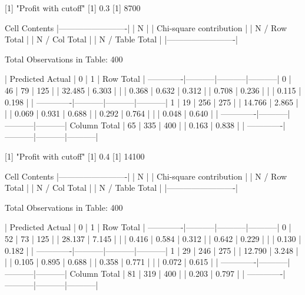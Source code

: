 \documentclass{article}
\begin{document}
\begin{Schunk}
\begin{Soutput}
 
[1] "Profit with cutoff"
[1] 0.3
[1] 8700

 
   Cell Contents
|-------------------------|
|                       N |
| Chi-square contribution |
|           N / Row Total |
|           N / Col Total |
|         N / Table Total |
|-------------------------|

 
Total Observations in Table:  400 

 
             | Predicted 
      Actual |         0 |         1 | Row Total | 
-------------|-----------|-----------|-----------|
           0 |        46 |        79 |       125 | 
             |    32.485 |     6.303 |           | 
             |     0.368 |     0.632 |     0.312 | 
             |     0.708 |     0.236 |           | 
             |     0.115 |     0.198 |           | 
-------------|-----------|-----------|-----------|
           1 |        19 |       256 |       275 | 
             |    14.766 |     2.865 |           | 
             |     0.069 |     0.931 |     0.688 | 
             |     0.292 |     0.764 |           | 
             |     0.048 |     0.640 |           | 
-------------|-----------|-----------|-----------|
Column Total |        65 |       335 |       400 | 
             |     0.163 |     0.838 |           | 
-------------|-----------|-----------|-----------|

 
[1] "Profit with cutoff"
[1] 0.4
[1] 14100

 
   Cell Contents
|-------------------------|
|                       N |
| Chi-square contribution |
|           N / Row Total |
|           N / Col Total |
|         N / Table Total |
|-------------------------|

 
Total Observations in Table:  400 

 
             | Predicted 
      Actual |         0 |         1 | Row Total | 
-------------|-----------|-----------|-----------|
           0 |        52 |        73 |       125 | 
             |    28.137 |     7.145 |           | 
             |     0.416 |     0.584 |     0.312 | 
             |     0.642 |     0.229 |           | 
             |     0.130 |     0.182 |           | 
-------------|-----------|-----------|-----------|
           1 |        29 |       246 |       275 | 
             |    12.790 |     3.248 |           | 
             |     0.105 |     0.895 |     0.688 | 
             |     0.358 |     0.771 |           | 
             |     0.072 |     0.615 |           | 
-------------|-----------|-----------|-----------|
Column Total |        81 |       319 |       400 | 
             |     0.203 |     0.797 |           | 
-------------|-----------|-----------|-----------|


\end{Soutput}
\end{Schunk}
\end{document}
